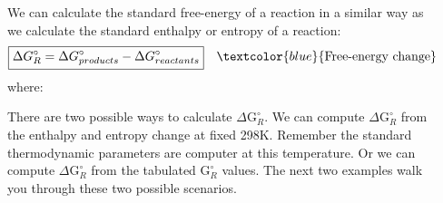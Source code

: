 \documentclass[main.tex]{subfiles}
\newcommand\chapterlabel{entropy}
\begin{document}
\begin{description}
\item[]
We can calculate the standard free-energy of a reaction in a similar way as we calculate the standard enthalpy or entropy of a reaction:
\begin{equation}\begin{split}
\boxed{  \Delta G^{\circ}_R=\Delta G^{\circ}_{products}-\Delta G^{\circ}_{reactants}  } \quad \textcolor{blue}{\text{Free-energy change}}\label{\chapterlabel:equation9}
\end{split}\end{equation}
where:
 There are two possible ways to calculate $\Delta \text{G}_R^{\circ}$. We can compute $\Delta \text{G}_R^{\circ}$ from the enthalpy and entropy change at fixed 298K. Remember the standard thermodynamic parameters are computer at this temperature. Or we can compute $\Delta \text{G}_R^{\circ}$ from the tabulated $\text{G}_R^{\circ}$ values. The next two examples walk you through these two possible scenarios.
 

\end{description}
\end{document}
